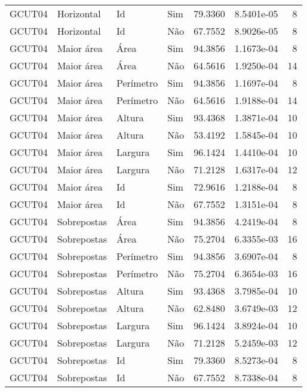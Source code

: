 \begin{tabular}{llllrrr}
    GCUT04    & Horizontal  & Id        & Sim         & 79.3360      & 8.5401e-05 & 8        \\
    GCUT04    & Horizontal  & Id        & Não         & 67.7552      & 8.9026e-05 & 8        \\
    GCUT04    & Maior área  & Área      & Sim         & 94.3856      & 1.1673e-04 & 8        \\
    GCUT04    & Maior área  & Área      & Não         & 64.5616      & 1.9250e-04 & 14       \\
    GCUT04    & Maior área  & Perímetro & Sim         & 94.3856      & 1.1697e-04 & 8        \\
    GCUT04    & Maior área  & Perímetro & Não         & 64.5616      & 1.9188e-04 & 14       \\
    GCUT04    & Maior área  & Altura    & Sim         & 93.4368      & 1.3871e-04 & 10       \\
    GCUT04    & Maior área  & Altura    & Não         & 53.4192      & 1.5845e-04 & 10       \\
    GCUT04    & Maior área  & Largura   & Sim         & 96.1424      & 1.4410e-04 & 10       \\
    GCUT04    & Maior área  & Largura   & Não         & 71.2128      & 1.6317e-04 & 12       \\
    GCUT04    & Maior área  & Id        & Sim         & 72.9616      & 1.2188e-04 & 8        \\
    GCUT04    & Maior área  & Id        & Não         & 67.7552      & 1.3151e-04 & 8        \\
    GCUT04    & Sobrepostas & Área      & Sim         & 94.3856      & 4.2419e-04 & 8        \\
    GCUT04    & Sobrepostas & Área      & Não         & 75.2704      & 6.3355e-03 & 16       \\
    GCUT04    & Sobrepostas & Perímetro & Sim         & 94.3856      & 3.6907e-04 & 8        \\
    GCUT04    & Sobrepostas & Perímetro & Não         & 75.2704      & 6.3654e-03 & 16       \\
    GCUT04    & Sobrepostas & Altura    & Sim         & 93.4368      & 3.7985e-04 & 10       \\
    GCUT04    & Sobrepostas & Altura    & Não         & 62.8480      & 3.6749e-03 & 12       \\
    GCUT04    & Sobrepostas & Largura   & Sim         & 96.1424      & 3.8924e-04 & 10       \\
    GCUT04    & Sobrepostas & Largura   & Não         & 71.2128      & 5.2459e-03 & 12       \\
    GCUT04    & Sobrepostas & Id        & Sim         & 79.3360      & 8.5273e-04 & 8        \\
    GCUT04    & Sobrepostas & Id        & Não         & 67.7552      & 8.7338e-04 & 8        \\
    \hline
\end{tabular}